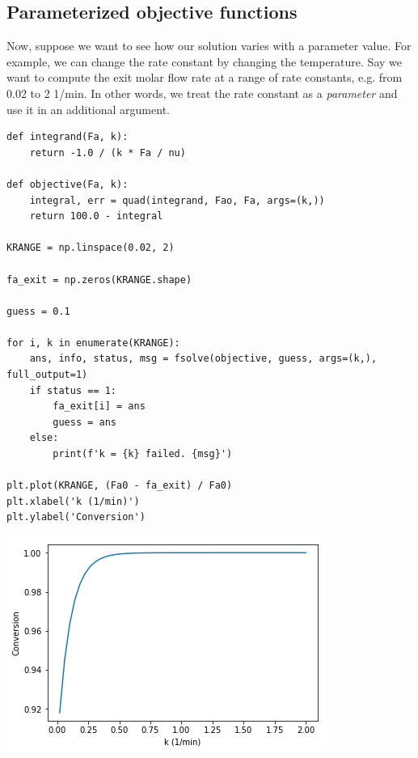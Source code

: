 \documentclass[11pt]{article}
\begin{document}
\subsection{Parameterized objective functions}
\label{sec:org5014151}

Now, suppose we want to see how our solution varies with a parameter value. For example, we can change the rate constant by changing the temperature. Say we want to compute the exit molar flow rate at a range of rate constants, e.g. from 0.02 to 2 1/min. In other words, we treat the rate constant as a \emph{parameter} and use it in an additional argument.

\begin{verbatim}
def integrand(Fa, k):
    return -1.0 / (k * Fa / nu)

def objective(Fa, k):
    integral, err = quad(integrand, Fao, Fa, args=(k,))
    return 100.0 - integral

KRANGE = np.linspace(0.02, 2)

fa_exit = np.zeros(KRANGE.shape)

guess = 0.1

for i, k in enumerate(KRANGE):
    ans, info, status, msg = fsolve(objective, guess, args=(k,), full_output=1)
    if status == 1:
        fa_exit[i] = ans
        guess = ans
    else:
        print(f'k = {k} failed. {msg}')

plt.plot(KRANGE, (Fa0 - fa_exit) / Fa0)
plt.xlabel('k (1/min)')
plt.ylabel('Conversion')
\end{verbatim}

\begin{center}
\includegraphics[width=.9\linewidth]{obipy-resources/a42b059ba3fd2f94b3a34f1c9b427f54-26729VVv.png}
\end{center}
\end{document}
